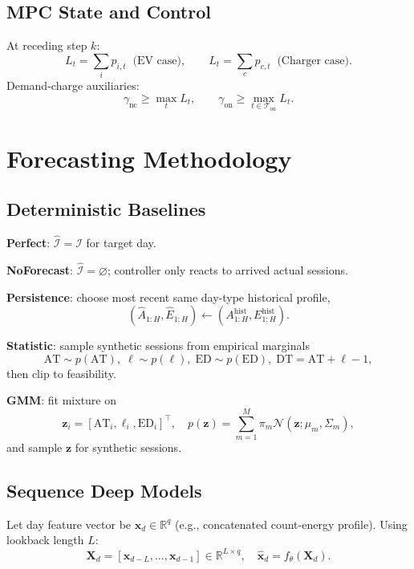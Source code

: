 \documentclass[journal]{IEEEtran}
\newcommand{\AT}{\mathrm{AT}}
\newcommand{\DT}{\mathrm{DT}}
\newcommand{\ED}{\mathrm{ED}}
\newcommand{\R}{\mathbb{R}}
\begin{document}
\subsection{MPC State and Control}
At receding step $k$:
\begin{equation}
L_t = \sum_{i} p_{i,t} \;\;\text{(EV case)},\qquad
L_t = \sum_{c} p_{c,t} \;\;\text{(Charger case)}.
\end{equation}
Demand-charge auxiliaries:
\begin{equation}
\gamma_{\mathrm{nc}} \ge \max_t L_t,\qquad
\gamma_{\mathrm{on}} \ge \max_{t \in \mathcal{T}_{\mathrm{on}}} L_t.
\end{equation}

\section{Forecasting Methodology}

\subsection{Deterministic Baselines}
\textbf{Perfect}: $\hat{\mathcal{I}}=\mathcal{I}$ for target day.

\textbf{NoForecast}: $\hat{\mathcal{I}}=\varnothing$; controller only reacts to arrived actual sessions.

\textbf{Persistence}: choose most recent same day-type historical profile,
\begin{equation}
(\hat{A}_{1:H},\hat{E}_{1:H}) \leftarrow (A^{\mathrm{hist}}_{1:H},E^{\mathrm{hist}}_{1:H}).
\end{equation}

\textbf{Statistic}: sample synthetic sessions from empirical marginals
\begin{equation}
\AT \sim p(\AT),\;\ell\sim p(\ell),\;\ED\sim p(\ED),\;\DT=\AT+\ell-1,
\end{equation}
then clip to feasibility.

\textbf{GMM}: fit mixture on
\begin{equation}
\mathbf{z}_i=[\AT_i,\ell_i,\ED_i]^\top,
\quad p(\mathbf{z})=\sum_{m=1}^{M}\pi_m\mathcal{N}(\mathbf{z};\mu_m,\Sigma_m),
\end{equation}
and sample $\mathbf{z}$ for synthetic sessions.

\subsection{Sequence Deep Models}
Let day feature vector be $\mathbf{x}_d \in \R^{q}$ (e.g., concatenated count-energy profile). Using lookback length $L$:
\begin{equation}
\mathbf{X}_d=[\mathbf{x}_{d-L},\dots,\mathbf{x}_{d-1}] \in \R^{L\times q},
\quad \hat{\mathbf{x}}_d=f_\theta(\mathbf{X}_d).
\end{equation}
\end{document}

